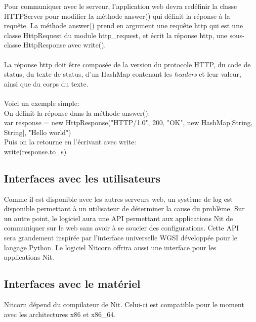 \documentclass{scrreprt}
\begin{document}
Pour communiquer avec le serveur, l'application web devra redéfinir la classe HTTPServer pour modifier la méthode answer() qui définit la réponse à la requête. 
La méthode answer() prend en argument une requête http qui est une classe HttpRequest du module http_request, et écrit la réponse http, une sous-classe HttpResponse avec write().\\\\
La réponse http doit être composée de la version du protocole HTTP, du code de status, du texte de status, d'un HashMap contenant les \textit{headers} et leur valeur, ainsi que du corps du texte.\\\\
Voici un exemple simple:\\
On définit la réponse dans la méthode answer():\\
var response = new HttpResponse("HTTP/1.0", 200, "OK", new HashMap[String, String], "Hello world")\\
Puis on la retourne en l'écrivant avec write:\\
write(response.to_s)\\


\subsection{Interfaces avec les utilisateurs}
Comme il est disponible avec les autres serveurs web, un système de log est
disponible permettant à un utilisateur de déterminer la cause du problème. Sur
un autre point, le logiciel aura une API permettant aux applications Nit de
communiquer sur le web sans avoir à se soucier des configurations. Cette
API sera grandement inspirée par l'interface universelle WGSI développée pour
le langage Python. Le logiciel Nitcorn offrira aussi une interface pour les
applications Nit.

\subsection{Interfaces avec le matériel}
Nitcorn dépend du compilateur de Nit. Celui-ci est compatible pour le moment avec
les architectures x86 et x86_64.
\end{document}
